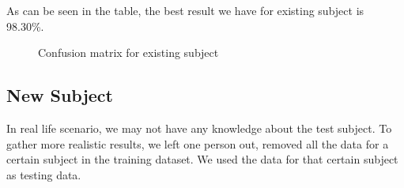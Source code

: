 \documentclass{article} %
\begin{document}
As can be seen in the table, the best result we have for existing subject is 98.30\%.

\begin{figure}[hbt]
\begin{center}
\end{center}
\caption{Confusion matrix for existing subject}
\end{figure}


\subsection{New Subject}

In real life scenario, we may not have any knowledge about the test subject. To gather more realistic results, we left one person out, removed all the data for a certain subject in the training dataset. We used the data for that certain subject as testing data.  
\end{document}
